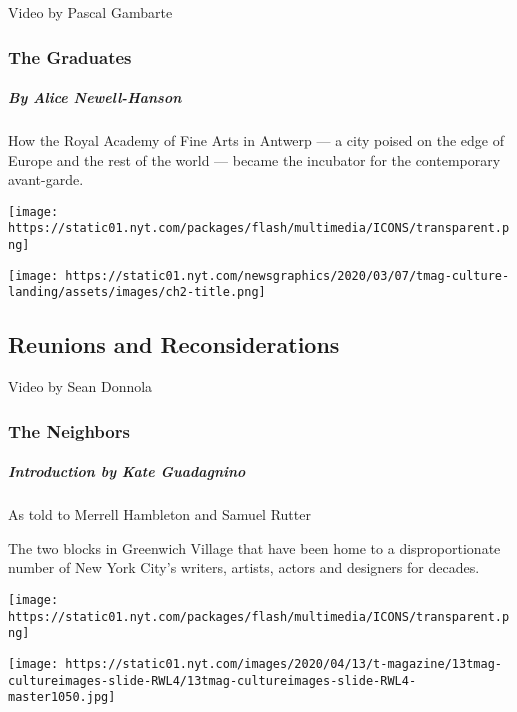 Video by Pascal Gambarte

\hypertarget{the-graduates}{%
\subsubsection{The Graduates}\label{the-graduates}}

\hypertarget{by-alice-newell-hanson}{%
\subparagraph{By Alice Newell-Hanson}\label{by-alice-newell-hanson}}

How the Royal Academy of Fine Arts in Antwerp --- a city poised on the
edge of Europe and the rest of the world --- became the incubator for
the contemporary avant-garde.

\texttt{[image: https://static01.nyt.com/packages/flash/multimedia/ICONS/transparent.png]}

\texttt{[image: https://static01.nyt.com/newsgraphics/2020/03/07/tmag-culture-landing/assets/images/ch2-title.png]}

\hypertarget{reunions-and-reconsiderations}{%
\subsection{Reunions and
Reconsiderations}\label{reunions-and-reconsiderations}}

\href{https://www.nytimes.com/interactive/2020/04/13/t-magazine/ninth-street-greenwich-village-neighbors.html}{}

Video by Sean Donnola

\hypertarget{the-neighbors}{%
\subsubsection{The Neighbors}\label{the-neighbors}}

\hypertarget{introduction-by-kate-guadagnino}{%
\subparagraph{Introduction by Kate
Guadagnino}\label{introduction-by-kate-guadagnino}}

As told to Merrell Hambleton and Samuel Rutter

The two blocks in Greenwich Village that have been home to a
disproportionate number of New York City's writers, artists, actors and
designers for decades.

\href{https://www.nytimes.com/interactive/2020/04/13/t-magazine/omen-restaurant-nyc.html}{}

\texttt{[image: https://static01.nyt.com/packages/flash/multimedia/ICONS/transparent.png]}

\texttt{[image: https://static01.nyt.com/images/2020/04/13/t-magazine/13tmag-cultureimages-slide-RWL4/13tmag-cultureimages-slide-RWL4-master1050.jpg]}


